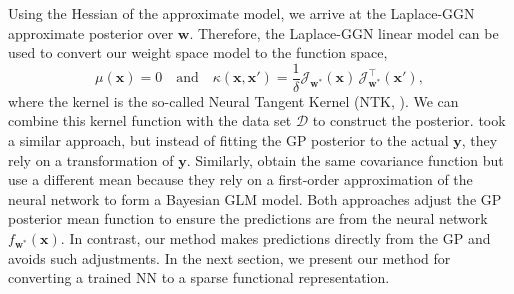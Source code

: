 \documentclass{article}
\newcommand{\dataset}{\ensuremath{\mathcal{D}}}
\newcommand{\weights}{\ensuremath{\mathbf{w}}}
\newcommand{\mbf}[1]{\mathbf{#1}}
\newcommand{\vx}{\mbf{x}}
\newcommand{\vy}{\mbf{y}}
\newcommand{\vw}{\mbf{w}}
\newcommand{\Jac}[2]{\mathcal{J}_{#1}(#2)}
\newcommand{\JacT}[2]{\mathcal{J}_{#1}^\top(#2)}
\newcommand{\GP}{\mathcal{GP}}
\begin{document}
Using the Hessian of the approximate model, we arrive at the Laplace-GGN approximate posterior over $\vw$.
Therefore, the Laplace-GGN linear model can be used to convert our weight space model to the function space,
\begin{equation}
\label{eq-laplace-approx-function-space}
  \mu(\vx) =  0 \quad \text{and} \quad
  \kappa(\vx, \vx')
  = \frac{1}{\delta} \Jac{\weights^*}{\vx} \, \JacT{\weights^*}{\vx'}, 
\end{equation}
where the kernel is the so-called Neural Tangent Kernel (NTK, \cite{jacot2018neural}).
We can combine this kernel function with the data set $\dataset$ to construct the posterior.
%
\citet{khan2019approximate} took a similar approach, but instead of fitting the GP posterior to the actual $\vy$, they rely on a transformation of $\vy$. Similarly, \citet{immer2021improving} obtain the same covariance function but use a different mean because they rely on a first-order approximation of the neural network to form a Bayesian GLM model. Both approaches adjust the GP posterior mean function to ensure the predictions are from the neural network $f_{\vw^*}(\vx)$.
In contrast, our method makes predictions directly from the GP and avoids such adjustments.
In the next section, we present our method for converting a trained NN to a sparse functional representation.
\end{document}

